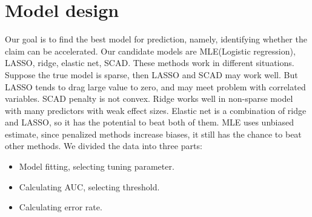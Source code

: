 \documentclass[paper=a4, fontsize=11pt]{scrartcl} %
\numberwithin{equation}{section} %
\numberwithin{figure}{section} %
\numberwithin{table}{section} %
\begin{document}
\section{Model design}
Our goal is to find the best model for prediction, namely, identifying whether the claim
can be accelerated. Our candidate models are MLE(Logistic regression), LASSO, ridge, elastic net, SCAD. These methods work in different situations. Suppose the true model is sparse, then LASSO and SCAD may work well. But LASSO tends to drag large value to zero, and may meet problem with correlated variables. SCAD penalty is not convex. Ridge works well in non-sparse model with many predictors with weak effect sizes. Elastic net is a combination of ridge and LASSO, so it has the potential to beat both of them. MLE uses unbiased estimate, since penalized methods increase biases, it still has the chance to beat other methods.  We divided the data into three parts: 
\begin{itemize}
\item Model fitting, selecting tuning parameter.
\item Calculating AUC, selecting threshold. 
\item Calculating error rate.
\end{itemize}
\end{document}
